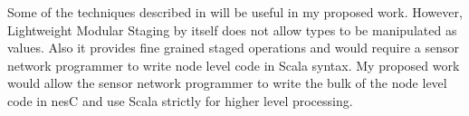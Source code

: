 \documentclass{article}
\begin{document}
Some of the techniques described in \cite{Rompf-LMS} will be useful in my proposed work.
However, Lightweight Modular Staging by itself does not allow types to be manipulated as values.
Also it provides fine grained staged operations and would require a sensor network programmer to
write node level code in Scala syntax. My proposed work would allow the sensor network
programmer to write the bulk of the node level code in nesC and use Scala strictly for higher
level processing.



\end{document}
